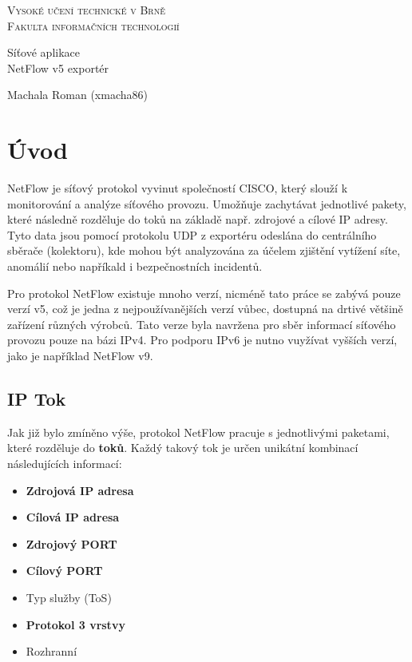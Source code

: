 \documentclass[11pt, a4paper, hidelinks]{article}[08.10.2023]
\begin{document}
\begin{titlepage}
    \begin{center}
        
        {\Huge \textsc{Vysoké učení technické v Brně}\\[0.5em]}
        {\huge \textsc{Fakulta informačních technologií}}
    
        {\LARGE Síťové aplikace\\[0.4em]
        NetFlow v5 exportér}
    
        {\Large \hfill {Machala Roman (xmacha86)}}
    \end{center}

\end{titlepage}

\tableofcontents
\pagebreak

\section{Úvod}
    NetFlow je síťový protokol vyvinut společností CISCO, který slouží k monitorování a analýze síťového provozu.
    Umožňuje zachytávat jednotlivé pakety, které následně rozděluje do toků na základě např. zdrojové a cílové IP adresy.
    Tyto data jsou pomocí protokolu UDP z exportéru odeslána do centrálního sběrače (kolektoru), kde
    mohou být analyzována za účelem zjištění vytížení síte, anomálií nebo napříkald i bezpečnostních incidentů\cite{Cisco_2019}.

    Pro protokol NetFlow existuje mnoho verzí, nicméně tato práce se 
    zabývá pouze verzí v5, což je jedna z nejpoužívanějších verzí vůbec, dostupná na drtivé většině
    zařízení různých výrobců. Tato verze byla navržena pro sběr informací síťového
    provozu pouze na bázi IPv4. Pro podporu IPv6 je nutno vuyžívat vyšších verzí, jako je například NetFlow v9\cite{ManageEngine}.

\subsection{IP Tok}
    Jak již bylo zmíněno výše, protokol NetFlow pracuje s jednotlivými paketami, které rozděluje do \textbf{toků}.
    Každý takový tok je určen unikátní kombinací následujících informací:
    \begin{itemize}
        \item{\textbf{Zdrojová IP adresa}}
        \item{\textbf{Cílová IP adresa}}
        \item{\textbf{Zdrojový PORT}}
        \item{\textbf{Cílový PORT}}
        \item{Typ služby (ToS)}
        \item{\textbf{Protokol 3 vrstvy}}
        \item{Rozhranní}
    \end{itemize}
\end{document}
